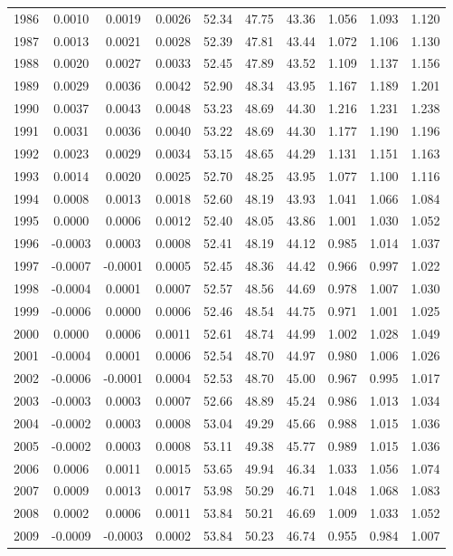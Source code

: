 \begin{tabular}{cccccccccc}
  1986 & 0.0010 & 0.0019 & 0.0026 & 52.34 & 47.75 & 43.36 & 1.056 & 1.093 & 1.120 \\ 
  1987 & 0.0013 & 0.0021 & 0.0028 & 52.39 & 47.81 & 43.44 & 1.072 & 1.106 & 1.130 \\ 
  1988 & 0.0020 & 0.0027 & 0.0033 & 52.45 & 47.89 & 43.52 & 1.109 & 1.137 & 1.156 \\ 
  1989 & 0.0029 & 0.0036 & 0.0042 & 52.90 & 48.34 & 43.95 & 1.167 & 1.189 & 1.201 \\ 
  1990 & 0.0037 & 0.0043 & 0.0048 & 53.23 & 48.69 & 44.30 & 1.216 & 1.231 & 1.238 \\ 
  1991 & 0.0031 & 0.0036 & 0.0040 & 53.22 & 48.69 & 44.30 & 1.177 & 1.190 & 1.196 \\ 
  1992 & 0.0023 & 0.0029 & 0.0034 & 53.15 & 48.65 & 44.29 & 1.131 & 1.151 & 1.163 \\ 
  1993 & 0.0014 & 0.0020 & 0.0025 & 52.70 & 48.25 & 43.95 & 1.077 & 1.100 & 1.116 \\ 
  1994 & 0.0008 & 0.0013 & 0.0018 & 52.60 & 48.19 & 43.93 & 1.041 & 1.066 & 1.084 \\ 
  1995 & 0.0000 & 0.0006 & 0.0012 & 52.40 & 48.05 & 43.86 & 1.001 & 1.030 & 1.052 \\ 
  1996 & -0.0003 & 0.0003 & 0.0008 & 52.41 & 48.19 & 44.12 & 0.985 & 1.014 & 1.037 \\ 
  1997 & -0.0007 & -0.0001 & 0.0005 & 52.45 & 48.36 & 44.42 & 0.966 & 0.997 & 1.022 \\ 
  1998 & -0.0004 & 0.0001 & 0.0007 & 52.57 & 48.56 & 44.69 & 0.978 & 1.007 & 1.030 \\ 
  1999 & -0.0006 & 0.0000 & 0.0006 & 52.46 & 48.54 & 44.75 & 0.971 & 1.001 & 1.025 \\ 
  2000 & 0.0000 & 0.0006 & 0.0011 & 52.61 & 48.74 & 44.99 & 1.002 & 1.028 & 1.049 \\ 
  2001 & -0.0004 & 0.0001 & 0.0006 & 52.54 & 48.70 & 44.97 & 0.980 & 1.006 & 1.026 \\ 
  2002 & -0.0006 & -0.0001 & 0.0004 & 52.53 & 48.70 & 45.00 & 0.967 & 0.995 & 1.017 \\ 
  2003 & -0.0003 & 0.0003 & 0.0007 & 52.66 & 48.89 & 45.24 & 0.986 & 1.013 & 1.034 \\ 
  2004 & -0.0002 & 0.0003 & 0.0008 & 53.04 & 49.29 & 45.66 & 0.988 & 1.015 & 1.036 \\ 
  2005 & -0.0002 & 0.0003 & 0.0008 & 53.11 & 49.38 & 45.77 & 0.989 & 1.015 & 1.036 \\ 
  2006 & 0.0006 & 0.0011 & 0.0015 & 53.65 & 49.94 & 46.34 & 1.033 & 1.056 & 1.074 \\ 
  2007 & 0.0009 & 0.0013 & 0.0017 & 53.98 & 50.29 & 46.71 & 1.048 & 1.068 & 1.083 \\ 
  2008 & 0.0002 & 0.0006 & 0.0011 & 53.84 & 50.21 & 46.69 & 1.009 & 1.033 & 1.052 \\ 
  2009 & -0.0009 & -0.0003 & 0.0002 & 53.84 & 50.23 & 46.74 & 0.955 & 0.984 & 1.007 \\ 
   \hline
\end{tabular}
